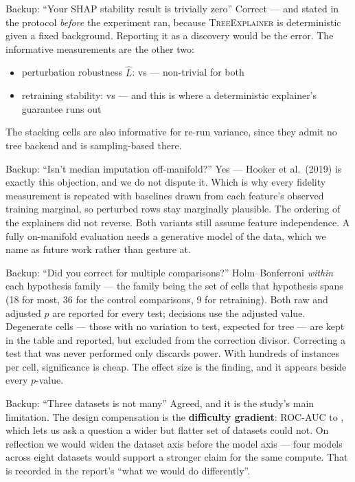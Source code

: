 \begin{frame}{Backup: ``Your SHAP stability result is trivially zero''}
\small
Correct --- and stated in the protocol \emph{before} the experiment ran, because
\textsc{TreeExplainer} is deterministic given a fixed background. Reporting it as a
discovery would be the error.
\medskip
The informative measurements are the other two:
\begin{itemize}
  \item perturbation robustness $\hat L$: \LipschitzShap{} vs \LipschitzLime{} ---
    non-trivial for both
  \item retraining stability: \RetrainShap{} vs \RetrainLime{} --- and this is where a
    deterministic explainer's guarantee runs out
\end{itemize}
The stacking cells are also informative for re-run variance, since they admit no tree
backend and \shap{} is sampling-based there.
\end{frame}

\begin{frame}{Backup: ``Isn't median imputation off-manifold?''}
\small
Yes --- Hooker et al.\ (2019) is exactly this objection, and we do not dispute it.
\medskip
Which is why every fidelity measurement is repeated with baselines drawn from each
feature's observed training marginal, so perturbed rows stay marginally plausible. The
ordering of the explainers did not reverse.
\medskip
Both variants still assume feature independence. A fully on-manifold evaluation needs a
generative model of the data, which we name as future work rather than gesture at.
\end{frame}

\begin{frame}{Backup: ``Did you correct for multiple comparisons?''}
\small
Holm--Bonferroni \emph{within} each hypothesis family --- the family being the set of
cells that hypothesis spans (18 for most, 36 for the control comparisons, 9 for
retraining). Both raw and adjusted $p$ are reported for every test; decisions use the
adjusted value.
\medskip
Degenerate cells --- those with no variation to test, expected for tree \shap{} --- are
kept in the table and reported, but excluded from the correction divisor. Correcting a
test that was never performed only discards power.
\medskip
With hundreds of instances per cell, significance is cheap. The effect size is the
finding, and it appears beside every $p$-value.
\end{frame}

\begin{frame}{Backup: ``Three datasets is not many''}
\small
Agreed, and it is the study's main limitation.
\medskip
The design compensation is the \textbf{difficulty gradient}: ROC-AUC \AucPima{} to
\AucCkd{}, which lets us ask a question a wider but flatter set of datasets could not.
\medskip
On reflection we would widen the dataset axis before the model axis --- four models
across eight datasets would support a stronger claim for the same compute. That is
recorded in the report's ``what we would do differently''.
\end{frame}

